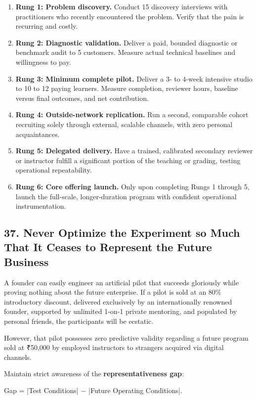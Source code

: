 \begin{enumerate}
    \item \textbf{Rung 1: Problem discovery.} Conduct 15 discovery interviews with practitioners who recently encountered the problem. Verify that the pain is recurring and costly.
    \item \textbf{Rung 2: Diagnostic validation.} Deliver a paid, bounded diagnostic or benchmark audit to 5 customers. Measure actual technical baselines and willingness to pay.
    \item \textbf{Rung 3: Minimum complete pilot.} Deliver a 3- to 4-week intensive studio to 10 to 12 paying learners. Measure completion, reviewer hours, baseline versus final outcomes, and net contribution.
    \item \textbf{Rung 4: Outside-network replication.} Run a second, comparable cohort recruiting solely through external, scalable channels, with zero personal acquaintances.
    \item \textbf{Rung 5: Delegated delivery.} Have a trained, calibrated secondary reviewer or instructor fulfill a significant portion of the teaching or grading, testing operational repeatability.
    \item \textbf{Rung 6: Core offering launch.} Only upon completing Rungs 1 through 5, launch the full-scale, longer-duration program with confident operational instrumentation.
\end{enumerate}

\subsection*{37. Never Optimize the Experiment so Much That It Ceases to Represent the Future Business}

A founder can easily engineer an artificial pilot that succeeds gloriously while proving nothing about the future enterprise. If a pilot is sold at an 80\% introductory discount, delivered exclusively by an internationally renowned founder, supported by unlimited 1-on-1 private mentoring, and populated by personal friends, the participants will be ecstatic.

However, that pilot possesses zero predictive validity regarding a future program sold at ₹50,000 by employed instructors to strangers acquired via digital channels.

Maintain strict awareness of the \textbf{representativeness gap}:
\begin{center}
Gap = |Test Conditions| $-$ |Future Operating Conditions|.
\end{center}

